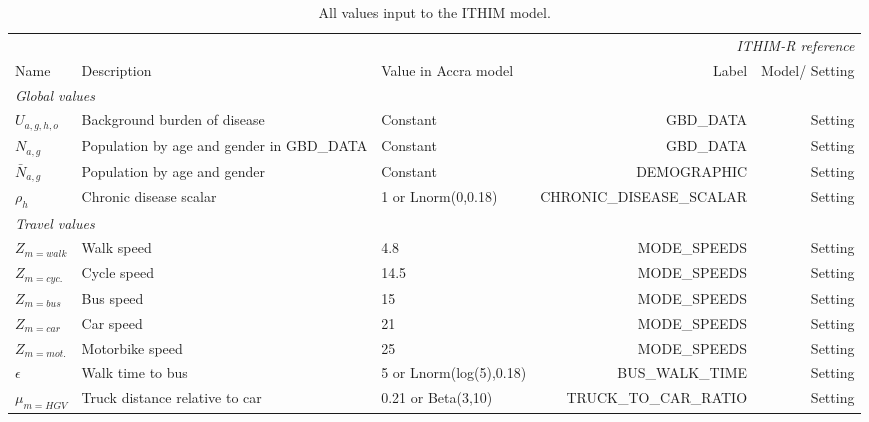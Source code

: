 \documentclass{article}
\begin{document}
\begin{landscape}

\begin{center}
\begin{longtable}{lp{5cm}|lrr}
\caption{\small All values input to the ITHIM model.}\\
\label{inputs}
&&\multicolumn{3}{r}{\textit{ITHIM-R reference}}\\

Name & Description & Value in Accra model & Label & Model/ Setting\\

\hline
\multicolumn{2}{l|}{\textit{Global values}}&&&\\
\hline
$U_{a,g,h,o}$ & Background burden of disease   & Constant & GBD\_DATA &  Setting \\

$N_{a,g}$ & Population by age and gender in GBD\_DATA & Constant & GBD\_DATA & Setting \\



$\bar{N}_{a,g}$ & Population by age and gender & Constant & DEMOGRAPHIC & Setting \\

$\rho_h$ & Chronic disease scalar & 1 or Lnorm(0,0.18) & CHRONIC\_DISEASE\_SCALAR & Setting \\ 
\hline
\multicolumn{2}{l|}{\textit{Travel values}}\\
\hline

$Z_{m=walk}$ & Walk speed & 4.8 & MODE\_SPEEDS &  Setting \\
$Z_{m=cyc.}$ & Cycle speed & 14.5 & MODE\_SPEEDS  & Setting \\
$Z_{m=bus}$ & Bus speed & 15 & MODE\_SPEEDS & Setting \\
$Z_{m=car}$ & Car speed & 21 & MODE\_SPEEDS &  Setting \\
$Z_{m=mot.}$ & Motorbike speed & 25 & MODE\_SPEEDS  & Setting \\
 
$\epsilon$ & Walk time to bus & 5 or Lnorm(log(5),0.18) & BUS\_WALK\_TIME &  Setting \\


$\mu_{m=HGV}$ & Truck distance relative to car & 0.21 or Beta(3,10) & TRUCK\_TO\_CAR\_RATIO &  Setting \\


\end{longtable}
\end{center}
\end{landscape}
\end{document}
